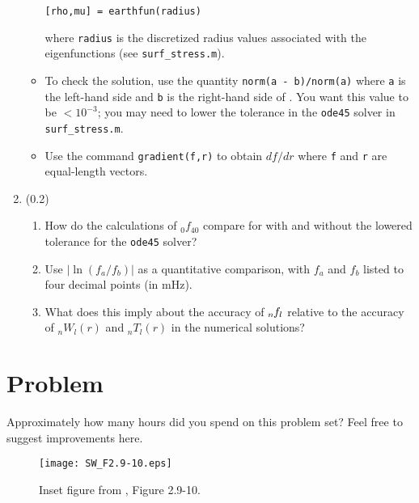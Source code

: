 \documentclass[11pt,titlepage,fleqn]{article}
\newcommand{\Tnl}{\mbox{${}_nT_l$}}
\newcommand{\Wnl}{\mbox{${}_nW_l$}}
\newcommand{\fnl}{\mbox{${}_{n\hspace{-0.2 mm}}f_l$}}
\begin{document}
\begin{enumerate}
\begin{itemize}
\verb+[rho,mu] = earthfun(radius)+

\noindent
where \verb+radius+ is the discretized radius values associated with the eigenfunctions (see \verb+surf_stress.m+). 

\item To check the solution, use the quantity \verb+norm(a - b)/norm(a)+ where \verb+a+ is the left-hand side and \verb+b+ is the right-hand side of . You want this value to be $< 10^{-3}$; you may need to lower the tolerance in the \verb+ode45+ solver in \verb+surf_stress.m+.

\item Use the command \verb+gradient(f,r)+ to obtain $df/dr$ where \verb+f+ and \verb+r+ are equal-length vectors.
\end{itemize}

\item (0.2)
%
\begin{enumerate}
\item How do the calculations of $_0f_{40}$ compare for with and without the lowered tolerance for the \verb+ode45+ solver?
\item Use $|\ln(f_a/f_b)|$ as a quantitative comparison, with $f_a$ and $f_b$ listed to four decimal points (in mHz).
\item What does this imply about the accuracy of $\fnl$ relative to the accuracy of $\Wnl(r)$ and $\Tnl(r)$ in the numerical solutions?
\end{enumerate}

\end{enumerate}


\section*{Problem}

Approximately how many hours did you spend on this problem set? Feel free to suggest improvements here.


\clearpage\pagebreak

\begin{figure}
\centering
\texttt{[image: SW\_F2.9-10.eps]}
\caption[]
{{
Inset figure from \citet{SteinWysession}, Figure 2.9-10.
\label{fig:}
}}
\end{figure}
\end{document}
